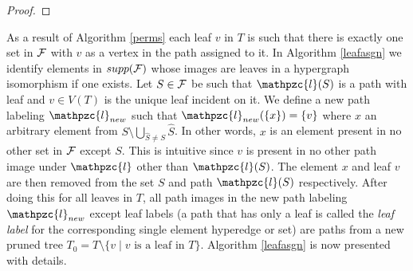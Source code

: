 \documentclass[11pt,letter]{../lib/llncs}
\def\cF{{\cal F}}
\def\hS{{\hat S}}
\def\cl{\mathpzc{l}}
\def\xnoindent{\noindent} %
\newcommand{\set}[1]{\left\{ #1\right\}}
\begin{document}
\begin{proof}
\end{proof}

\xnoindent As a result of Algorithm \ref{perms} each leaf $v$ in $T$
is such that there is exactly one set in $\cF$ with $v$ as a vertex in
the path assigned to it.  In Algorithm \ref{leafasgn} we identify
elements in $supp(\cF)$ whose images are leaves in a hypergraph
isomorphism if one exists.  Let $S \in \cF$ be such that $\cl(S)$ is a
path with leaf and $v \in V(T)$ is the unique leaf incident on it.  We
define a new path labeling $\cl_{new}$ such that $\cl_{new}(\set{x}) =
\set{v}$ where $x$ an arbitrary element from $S \setminus \bigcup_{\hS
  \ne S} \hS$. In other words, $x$ is an element present in no other
set in $\cF$ except $S$. This is intuitive since $v$ is present in no
other path image under $\cl$ other than $\cl(S)$.  The element $x$ and
leaf $v$ are then removed from the set $S$ and path $\cl(S)$
respectively. After doing this for all leaves in $T$, all path images
in the new path labeling $\cl_{new}$ except leaf labels (a path that
has only a leaf is called the {\em leaf label} for the corresponding
single element hyperedge or set) are paths from a new pruned tree $T_0
= T \setminus \{v \mid v \text{ is a leaf in } T\}$. Algorithm
\ref{leafasgn} is now presented with details.
\end{document}
